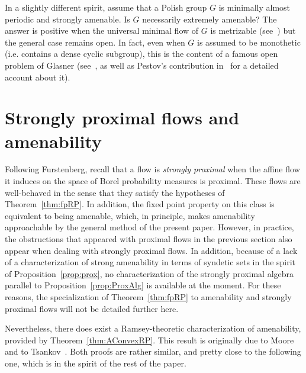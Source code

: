\documentclass[11pt]{article}
\theoremstyle{definition}
\numberwithin{equation}{section}
\numberwithin{figure}{section}
\numberwithin{table}{section}
\begin{document}
In a slightly different spirit, assume that a Polish group $G$ is minimally almost periodic and strongly amenable. Is $G$ necessarily extremely amenable? The answer is positive when the universal minimal flow of $G$ is metrizable (see~\cite{NVT8}) but the general case remains open. In fact, even when $G$ is assumed to be monothetic (i.e. contains a dense cyclic subgroup), this is the content of a famous open problem of Glasner (see~\cite{Gl1}, as well as Pestov's contribution in~\cite{OT} for a detailed account about it).

\section{Strongly proximal flows and amenability}
\label{section:stronglyproximal}

Following Furstenberg, recall that a flow is \emph{strongly proximal} when the affine flow it induces on the space of Borel probability measures is proximal. These flows are well-behaved in the sense that they satisfy the hypotheses of Theorem~\ref{thm:fpRP}. In addition, the fixed point property on this class is equivalent to being amenable, which, in principle, makes amenability approachable by the general method of the present paper. However, in practice, the obstructions that appeared with proximal flows in the previous section also appear when dealing with strongly proximal flows. In addition, because of a lack of a characterization of strong amenability in terms of syndetic sets in the spirit of Proposition~\ref{prop:prox}, no characterization of the strongly proximal algebra parallel to Proposition~\ref{prop:ProxAlg} is available at the moment. For these reasons, the specialization of Theorem~\ref{thm:fpRP} to amenability and strongly proximal flows will not be detailed further here.

Nevertheless, there does exist a Ramsey-theoretic characterization of amenability, provided by Theorem~\ref{thm:AConvexRP}. This result is originally due to Moore~\cite{M} and to Tsankov~\cite{Ts1}. Both proofs are rather similar, and pretty close to the following one, which is in the spirit of the rest of the paper.
\end{document}
